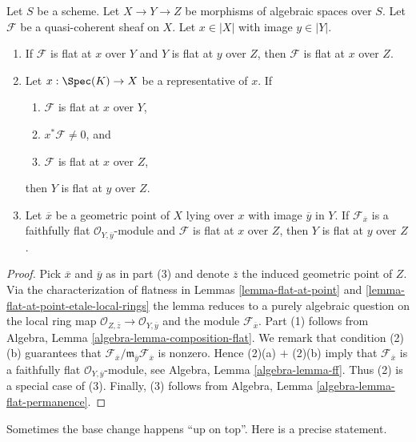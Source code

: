 \begin{lemma}
\label{lemma-composition-module-flat}
Let $S$ be a scheme. Let $X \to Y \to Z$ be morphisms of algebraic spaces
over $S$. Let $\mathcal{F}$ be a quasi-coherent sheaf on $X$.
Let $x \in |X|$ with image $y \in |Y|$.
\begin{enumerate}
\item If $\mathcal{F}$ is flat at $x$ over $Y$ and
$Y$ is flat at $y$ over $Z$, then $\mathcal{F}$ is flat at
$x$ over $Z$.
\item Let $x : \Spec(K) \to X$ be a representative of $x$. If
\begin{enumerate}
\item $\mathcal{F}$ is flat at $x$ over $Y$,
\item $x^*\mathcal{F} \not = 0$, and
\item $\mathcal{F}$ is flat at $x$ over $Z$,
\end{enumerate}
then $Y$ is flat at $y$ over $Z$.
\item Let $\overline{x}$ be a geometric point of $X$ lying over $x$
with image $\overline{y}$ in $Y$. If $\mathcal{F}_{\overline{x}}$ is a
faithfully flat $\mathcal{O}_{Y, \overline{y}}$-module and
$\mathcal{F}$ is flat at $x$ over $Z$, then
$Y$ is flat at $y$ over $Z$.
\end{enumerate}
\end{lemma}

\begin{proof}
Pick $\overline{x}$ and $\overline{y}$ as in part (3) and denote
$\overline{z}$ the induced geometric point of $Z$. Via the
characterization of flatness in
Lemmas \ref{lemma-flat-at-point} and
\ref{lemma-flat-at-point-etale-local-rings}
the lemma reduces to a purely algebraic question on the local
ring map $\mathcal{O}_{Z, \overline{z}} \to \mathcal{O}_{Y, \overline{y}}$
and the module $\mathcal{F}_{\overline{x}}$.
Part (1) follows from
Algebra, Lemma \ref{algebra-lemma-composition-flat}.
We remark that condition (2)(b) guarantees that
$\mathcal{F}_{\overline{x}}/
\mathfrak m_{\overline{y}} \mathcal{F}_{\overline{x}}$
is nonzero. Hence (2)(a) $+$ (2)(b) imply that $\mathcal{F}_{\overline{x}}$
is a faithfully flat $\mathcal{O}_{Y, \overline{y}}$-module, see
Algebra, Lemma \ref{algebra-lemma-ff}.
Thus (2) is a special case of (3).
Finally, (3) follows from
Algebra, Lemma \ref{algebra-lemma-flat-permanence}.
\end{proof}

\noindent
Sometimes the base change happens ``up on top''. Here is a precise statement.

